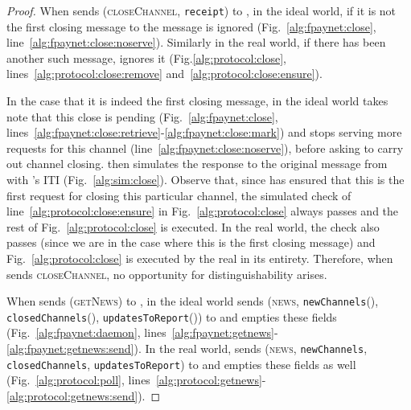 \begin{proof}
  When \environment{} sends (\textsc{closeChannel}, \texttt{receipt}) to \alice,
  in the ideal world, if it is not the first closing message to \alice{} the
  message is ignored (Fig.~\ref{alg:fpaynet:close},
  line~\ref{alg:fpaynet:close:noserve}). Similarly in the real world, if there
  has been another such message, \alice{} ignores it
  (Fig.\ref{alg:protocol:close}, lines~\ref{alg:protocol:close:remove}
  and~\ref{alg:protocol:close:ensure}).

  In the case that it is indeed the first closing message, in the ideal world
  \fpaynet{} takes note that this close is pending
  (Fig.~\ref{alg:fpaynet:close},
  lines~\ref{alg:fpaynet:close:retrieve}-\ref{alg:fpaynet:close:mark}) and stops
  serving more requests for this channel (line~\ref{alg:fpaynet:close:noserve}),
  before asking \simulator{} to carry out channel closing. \simulator{} then
  simulates the response to the original message from \environment{} with
  \alice's ITI (Fig.~\ref{alg:sim:close}). Observe that, since \fpaynet{} has
  ensured that this is the first request for closing this particular channel,
  the simulated check of line~\ref{alg:protocol:close:ensure} in
  Fig.~\ref{alg:protocol:close} always passes and the rest of
  Fig.~\ref{alg:protocol:close} is executed. In the real world, the check also
  passes (since we are in the case where this is the first closing message) and
  Fig.~\ref{alg:protocol:close} is executed by the real \alice{} in its
  entirety. Therefore, when \environment{} sends \textsc{closeChannel}, no
  opportunity for distinguishability arises.

  When \environment{} sends (\textsc{getNews}) to \alice, in the ideal world
  \fpaynet{} sends (\textsc{news}, \texttt{newChannels}(\alice),
  \texttt{closedChannels}(\alice), \texttt{updatesToReport}(\alice)) to
  \environment{} and empties these fields (Fig.~\ref{alg:fpaynet:daemon},
  lines~\ref{alg:fpaynet:getnews}-\ref{alg:fpaynet:getnews:send}). In the real
  world, \alice{} sends (\textsc{news}, \texttt{newChannels},
  \texttt{closedChannels}, \texttt{updatesToReport}) to \environment{} and
  empties these fields as well (Fig.~\ref{alg:protocol:poll},
  lines~\ref{alg:protocol:getnews}-\ref{alg:protocol:getnews:send}).


\end{proof}
